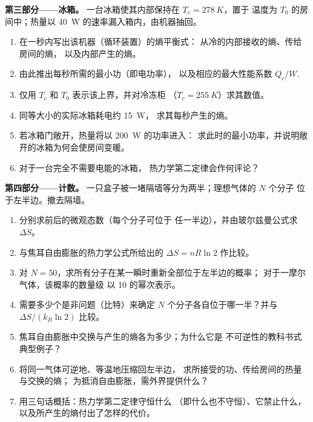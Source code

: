 \begin{problem}
\medskip
\noindent\textbf{第三部分——冰箱。}
一台冰箱使其内部保持在 $T_c = \qty{278}{K}$，置于
温度为 $T_0$ 的房间中；热量以 \qty{40}{W} 的速率漏入箱内，由机器抽回。
\begin{enumerate}[resume]
  \item 在一秒内写出该机器（循环装置）的熵平衡式：
        从冷的内部接收的熵、传给房间的熵，
        以及内部产生的熵。
  \item 由此推出每秒所需的最小功（即电功率），
        以及相应的最大性能系数
        $Q_c/W$.
  \item 仅用 $T_c$ 和 $T_0$ 表示该上界，并对冷冻柜
        （$T_c = \qty{255}{K}$）求其数值。
  \item 同等大小的实际冰箱耗电约 \qty{15}{W}，
        求其每秒产生的熵。
  \item 若冰箱门敞开，热量将以 \qty{200}{W} 的功率进入：
        求此时的最小功率，并说明敞开的冰箱为何会使房间变暖。
  \item 对于一台完全不需要电能的冰箱，
        热力学第二定律会作何评论？
\end{enumerate}

\medskip
\noindent\textbf{第四部分——计数。}
一只盒子被一堵隔墙等分为两半；理想气体的 $N$ 个分子
位于左半边。撤去隔墙。
\begin{enumerate}[resume]
  \item 分别求前后的微观态数（每个分子可位于
        任一半边），并由玻尔兹曼公式求 $\Delta S$。
  \item 与焦耳自由膨胀的热力学公式所给出的
        $\Delta S = nR\ln2$ 作比较。
  \item 对 $N = 50$，求所有分子在某一瞬时重新全部位于左半边的概率；
        对于一摩尔气体，该概率的数量级
        以 10 的幂次表示。
  \item 需要多少个是非问题（比特）来确定
        $N$ 个分子各自位于哪一半？并与 $\Delta S/(k_B\ln2)$ 比较。
  \item 焦耳自由膨胀中交换与产生的熵各为多少；为什么它是
        不可逆性的教科书式典型例子？
  \item 将同一气体可逆地、等温地压缩回左半边，
        求所接受的功、传给房间的热量与交换的熵；
        为抵消自由膨胀，需外界提供什么？
  \item 用三句话概括：热力学第二定律守恒什么
        （即什么也不守恒）、它禁止什么，以及所产生的熵付出了怎样的代价。
\end{enumerate}
\end{problem}
